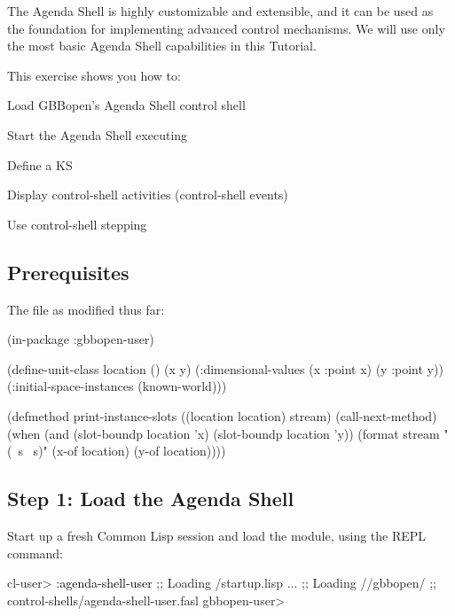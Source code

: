 \documentclass[10pt,twoside,english,pdftex]{article}
\begin{document}
The Agenda Shell is highly customizable and extensible, and it can be used as
the foundation for implementing advanced control mechanisms.  We will use only
the most basic Agenda Shell capabilities in this Tutorial.

\fndocrule

This exercise shows you how to:
%
\begin{tightitemize}
\item Load GBBopen's Agenda Shell control shell
\item Start the Agenda Shell executing
\item Define a KS
\item Display control-shell activities (control-shell events)
\item Use control-shell stepping
\end{tightitemize}

\fndocrule

\subsection*{Prerequisites}

The  file as modified thus far:
%
\W\supp
\begin{example}
  (in-package :gbbopen-user)

  (define-unit-class location ()
    (x y)
    (:dimensional-values
      (x :point x)
      (y :point y))
    (:initial-space-instances (known-world)))

  (defmethod print-instance-slots ((location location) stream)
    (call-next-method)
    (when (and (slot-boundp location 'x)
               (slot-boundp location 'y))
      (format stream " (~s ~s)"
              (x-of location)
              (y-of location))))
\end{example}

\subsection*{Step 1: Load the Agenda Shell}

Start up a fresh Common Lisp session and load the
 module, using the
 REPL command:
%
\W\supp
\begin{example}
\textcolor{darkergray}{%
  cl-user> \textcolor{black}{:agenda-shell-user}
  ;; Loading /startup.lisp
     ...
  ;; Loading //gbbopen/
  ;;            control-shells/agenda-shell-user.fasl
  gbbopen-user>}
\end{example}
\end{document}
